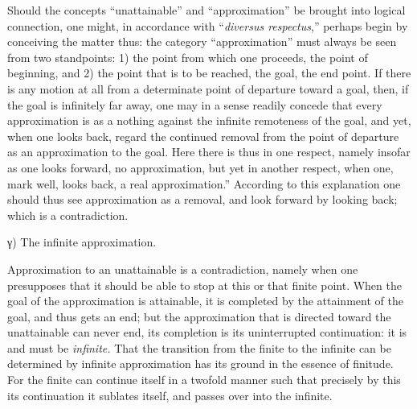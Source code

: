 \documentclass[12pt,a4paper,openany]{book}
\newcommand{\opage}[1]{\marginnote{\footnotesize\textit{[#1]}}}
\begin{document}
Should the concepts ``unattainable'' and ``approximation'' be brought into logical connection, one might, in accordance with ``\textit{diversus respectus},'' perhaps begin by conceiving the matter thus: the category ``approximation'' must always be seen from two standpoints: 1) the point from which one proceeds, the point of beginning, and 2) the point that is to be reached, the goal, the end point. If there is any motion at all from a determinate point of departure toward a goal, then, if the goal is infinitely far away, one may in a sense readily concede that every approximation is as a nothing against the infinite remoteness of the goal, and yet, when one looks back, regard the continued removal from the point of departure as an approximation to the goal. Here there is thus in one respect, namely insofar as one looks forward, no approximation, but yet in another respect, when one, mark well, looks back, a real approximation.'' According to this explanation one should thus see approximation as a
\setcounter{footnote}{0}%
\opage{37}removal, and look forward by looking back; which is a contradiction.

\begin{center}γ) The infinite approximation.\end{center}

Approximation to an unattainable is a contradiction, namely when one presupposes that it should be able to stop at this or that finite point. When the goal of the approximation is attainable, it is completed by the attainment of the goal, and thus gets an end; but the approximation that is directed toward the unattainable can never end, its completion is its uninterrupted continuation: it is and must be \emph{infinite.} That the transition from the finite to the infinite can be determined by infinite approximation has its ground in the essence of finitude. For the finite can continue itself in a twofold manner such that precisely by this its continuation it sublates itself, and passes over into the infinite.
\end{document}
